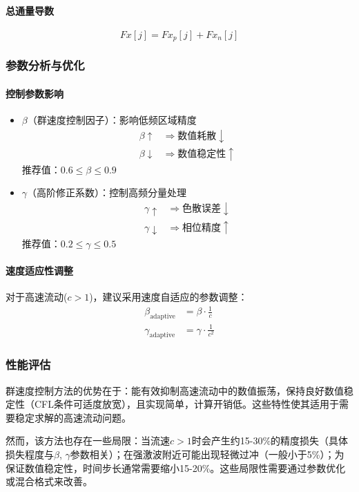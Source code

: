 \documentclass[12pt,a4paper]{article}
\begin{document}
\paragraph{总通量导数}
$$
Fx[j] = Fx_p[j] + Fx_n[j]
$$


\subsubsection{参数分析与优化}
\paragraph{控制参数影响}
\begin{itemize}
    \item $\beta$（群速度控制因子）：影响低频区域精度
    \begin{align*}
    \beta \uparrow &\Rightarrow \text{数值耗散} \downarrow \\
    \beta \downarrow &\Rightarrow \text{数值稳定性} \uparrow
    \end{align*}
    推荐值：$0.6 \leq \beta \leq 0.9$
    
    \item $\gamma$（高阶修正系数）：控制高频分量处理
    \begin{align*}
    \gamma \uparrow &\Rightarrow \text{色散误差} \downarrow \\
    \gamma \downarrow &\Rightarrow \text{相位精度} \uparrow
    \end{align*}
    推荐值：$0.2 \leq \gamma \leq 0.5$
\end{itemize}

\paragraph{速度适应性调整}
对于高速流动($c > 1$)，建议采用速度自适应的参数调整：
\begin{align*}
\beta_{\text{adaptive}} &= \beta \cdot \frac{1}{c} \\
\gamma_{\text{adaptive}} &= \gamma \cdot \frac{1}{c^2}
\end{align*}

\subsubsection{性能评估}
群速度控制方法的优势在于：能有效抑制高速流动中的数值振荡，保持良好数值稳定性（CFL条件可适度放宽），且实现简单，计算开销低。这些特性使其适用于需要稳定求解的高速流动问题。

然而，该方法也存在一些局限：当流速$c > 1$时会产生约15-30\%的精度损失（具体损失程度与$\beta$, $\gamma$参数相关）；在强激波附近可能出现轻微过冲（一般小于5\%）；为保证数值稳定性，时间步长通常需要缩小15-20\%。这些局限性需要通过参数优化或混合格式来改善。
\end{document}
